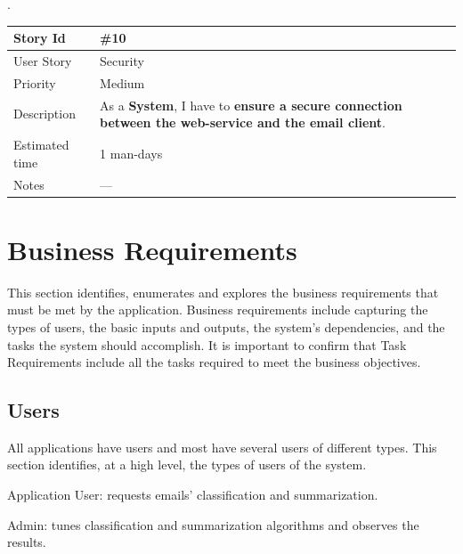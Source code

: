\documentclass[a4paper,10pt]{article}
\newenvironment{my_enumerate}
{\begin{enumerate}
  \setlength{\itemsep}{0cm}
  \setlength{\parskip}{0cm}}
{\end{enumerate}}
\begin{document}
.\\

\begin{tabular}{|p{3cm}|p{10cm}|}
\hline
\cellcolor[gray]{0.9} Story Id & \#10 \\ \hline
\cellcolor[gray]{0.9} User Story & Security \\ \hline
\cellcolor[gray]{0.9} Priority & Medium \\ \hline
\cellcolor[gray]{0.9} Description & 
	As a \textbf{System}, I have to \textbf{ensure a 
	secure connection between the web-service and the email client}. \\ \hline
\cellcolor[gray]{0.9} Estimated time & 1 man-days\\ \hline
\cellcolor[gray]{0.9} Notes & --- \\ \hline
\end{tabular}

\newpage
\section{Business Requirements}

This section identifies, enumerates and explores the business requirements that must 
be met by the application. Business requirements include capturing the types of users, 
the basic inputs and outputs, the system's dependencies, and the tasks the system should 
accomplish. It is important to confirm that Task Requirements include all the tasks 
required to meet the business objectives.

\subsection{Users}
All applications have users and most have several users of different types. This 
section identifies, at a high level, the types of users of the system.

\begin{my_enumerate}
  \item Application User: requests emails' classification and summarization.
  \item Admin: tunes classification and summarization algorithms and observes the results.
\end{my_enumerate}
\end{document}
